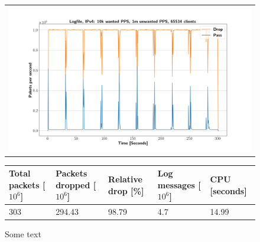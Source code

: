 \begin{figure}[h!]
	\label{fig:simplefail2ban:disk:ip4:1m}
	\centering
	\scriptsize
	\begin{tabular}{c}
    	\centerline{\includegraphics[width=1.2\textwidth]{images/simplefail2ban_disk_ipv4_v10k_iv1m_c65534.png}}
    \end{tabular}
	\begin{tabular}{lllll}
		\toprule
		\textbf{Total packets [$10^6$]} & \textbf{Packets dropped [$10^6$]} & \textbf{Relative drop [\%]} & \textbf{Log messages [$10^6$]} & \textbf{CPU [seconds]} \\ \midrule 
		303 & 294.43 & 98.79 & 4.7 & 14.99 \\
		\bottomrule
	\end{tabular}
	\caption[Simplefail2ban, Logfile IPv4, 1m \ac{PPS}]{Some text}
\end{figure}

